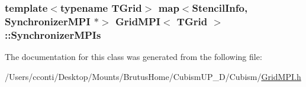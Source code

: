 \subsubsection[{Synchronizer\+M\+P\+Is}]{\setlength{\rightskip}{0pt plus 5cm}template$<$typename T\+Grid$>$ map$<${\bf Stencil\+Info}, {\bf Synchronizer\+M\+P\+I} $\ast$$>$ {\bf Grid\+M\+P\+I}$<$ T\+Grid $>$\+::Synchronizer\+M\+P\+Is\hspace{0.3cm}{\ttfamily [protected]}}\label{class_grid_m_p_i_a2630fe6ea5a92bc46e122bce621143e5}


The documentation for this class was generated from the following file\+:\begin{DoxyCompactItemize}
\item 
/\+Users/cconti/\+Desktop/\+Mounts/\+Brutus\+Home/\+Cubism\+U\+P\+\_\+D/\+Cubism/\hyperlink{_grid_m_p_i_8h}{Grid\+M\+P\+I.\+h}\end{DoxyCompactItemize}

